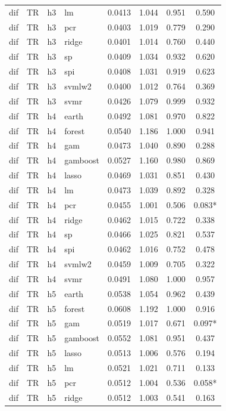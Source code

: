 \begin{ThreePartTable}
\begin{longtable}[t]{llclcccc}
dif & TR & h3 & lm & 0.0413 & 1.044 & 0.951 & 0.590\\
dif & TR & h3 & pcr & 0.0403 & 1.019 & 0.779 & 0.290\\
dif & TR & h3 & ridge & 0.0401 & 1.014 & 0.760 & 0.440\\
dif & TR & h3 & sp & 0.0409 & 1.034 & 0.932 & 0.620\\
dif & TR & h3 & spi & 0.0408 & 1.031 & 0.919 & 0.623\\
dif & TR & h3 & svmlw2 & 0.0400 & 1.012 & 0.764 & 0.369\\
dif & TR & h3 & svmr & 0.0426 & 1.079 & 0.999 & 0.932\\
\addlinespace
dif & TR & h4 & earth & 0.0492 & 1.081 & 0.970 & 0.822\\
dif & TR & h4 & forest & 0.0540 & 1.186 & 1.000 & 0.941\\
dif & TR & h4 & gam & 0.0473 & 1.040 & 0.890 & 0.288\\
dif & TR & h4 & gamboost & 0.0527 & 1.160 & 0.980 & 0.869\\
dif & TR & h4 & lasso & 0.0469 & 1.031 & 0.851 & 0.430\\
dif & TR & h4 & lm & 0.0473 & 1.039 & 0.892 & 0.328\\
dif & TR & h4 & pcr & 0.0455 & 1.001 & 0.506 & 0.083*\\
dif & TR & h4 & ridge & 0.0462 & 1.015 & 0.722 & 0.338\\
dif & TR & h4 & sp & 0.0466 & 1.025 & 0.821 & 0.537\\
dif & TR & h4 & spi & 0.0462 & 1.016 & 0.752 & 0.478\\
dif & TR & h4 & svmlw2 & 0.0459 & 1.009 & 0.705 & 0.322\\
dif & TR & h4 & svmr & 0.0491 & 1.080 & 1.000 & 0.957\\
\addlinespace
dif & TR & h5 & earth & 0.0538 & 1.054 & 0.962 & 0.439\\
dif & TR & h5 & forest & 0.0608 & 1.192 & 1.000 & 0.916\\
dif & TR & h5 & gam & 0.0519 & 1.017 & 0.671 & 0.097*\\
dif & TR & h5 & gamboost & 0.0552 & 1.081 & 0.951 & 0.437\\
dif & TR & h5 & lasso & 0.0513 & 1.006 & 0.576 & 0.194\\
dif & TR & h5 & lm & 0.0521 & 1.021 & 0.711 & 0.133\\
dif & TR & h5 & pcr & 0.0512 & 1.004 & 0.536 & 0.058*\\
dif & TR & h5 & ridge & 0.0512 & 1.003 & 0.541 & 0.163\\

\end{longtable}
\end{ThreePartTable}
